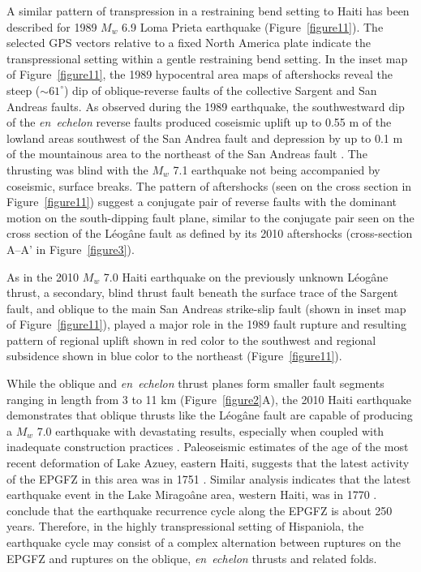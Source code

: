 \documentclass[linenumbers,draft]{agujournal}
\begin{document}
A similar pattern of transpression in a restraining bend setting to Haiti has been described for 1989 $M_w$ 6.9 Loma Prieta earthquake \citep{marshall1991faulting} (Figure~\ref{figure11}). The selected GPS vectors relative to a fixed North America plate \citep{UNAVCO2009} indicate the transpressional setting within a gentle restraining bend setting. In the inset map of Figure~\ref{figure11}, the 1989 hypocentral area maps of aftershocks \citep{marshall1991faulting} reveal the steep ($\sim61^{\circ}$) dip of oblique-reverse faults of the collective Sargent and San Andreas faults. As observed during the 1989 earthquake, the southwestward dip of the \textit{en~echelon} reverse faults produced coseismic uplift up to 0.55 m of the lowland areas southwest of the San Andrea fault and depression by up to 0.1 m of the mountainous area to the northeast of the San Andreas fault \citep{marshall1991faulting}. The thrusting was blind with the $M_w$ 7.1 earthquake not being accompanied by coseismic, surface breaks. The pattern of aftershocks (seen on the cross section in Figure~\ref{figure11}) suggest a conjugate pair of reverse faults with the dominant motion on the south-dipping fault plane, similar to the conjugate pair seen on the cross section of the L\'eog\^ane fault as defined by its 2010 aftershocks (cross-section A--A' in Figure~\ref{figure3}). 

As in the 2010 $M_w$ 7.0 Haiti earthquake on the previously unknown L\'eog\^ane thrust, a secondary, blind thrust fault \citep{olson1990seismicity} beneath the surface trace of the Sargent fault, and oblique to the main San Andreas strike-slip fault (shown in inset map of Figure~\ref{figure11}), played a major role in the 1989 fault rupture and resulting pattern of regional uplift shown in red color to the southwest and regional subsidence shown in blue color to the northeast (Figure~\ref{figure11}).

While the oblique and \textit{en~echelon} thrust planes form smaller fault segments ranging in length from 3 to 11 km (Figure~\ref{figure2}A), the 2010 Haiti earthquake demonstrates that oblique thrusts like the L\'eog\^ane fault are capable of producing a $M_w$ 7.0 earthquake with devastating results, especially when coupled with inadequate construction practices \citep{symithe2016present}. Paleoseismic estimates of the age of the most recent deformation of Lake Azuey, eastern Haiti, suggests that the latest activity of the EPGFZ in this area was in 1751 \citep{prentice2010seismic,bakun2012significant}. Similar analysis indicates that the latest earthquake event in the Lake Mirago\^ane area, western Haiti, was in 1770 \citep{bakun2012significant}. \citet{bakun2012significant} conclude that the earthquake recurrence cycle along the EPGFZ is about 250 years. Therefore, in the highly transpressional setting of Hispaniola, the earthquake cycle may consist of a complex alternation between ruptures on the EPGFZ and ruptures on the oblique, \textit{en~echelon} thrusts and related folds. 
\end{document}
